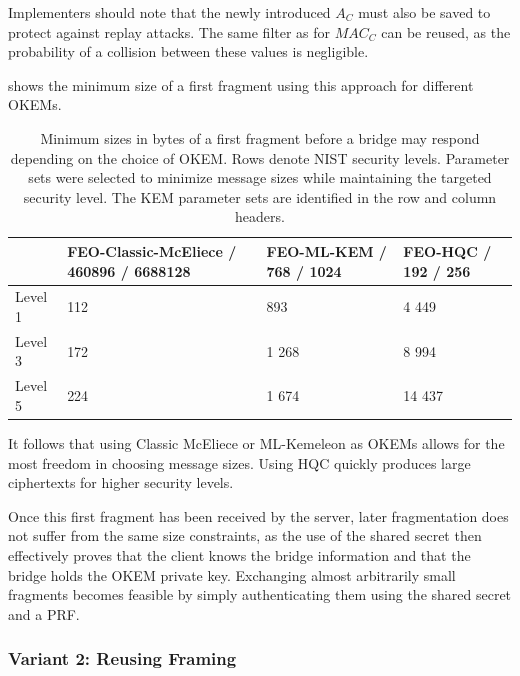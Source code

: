 Implementers should note that the newly introduced $A_C$ must also be saved to protect against replay attacks. The same filter as for $MAC_C$ can be reused, as the probability of a collision between these values is negligible.

 shows the minimum size of a first fragment using this approach for different OKEMs.

\begin{table}
    \centering
    \begin{tabular}{@{} L{0.1\textwidth-\tabcolsep} | R{0.35\tabcolsep} R{0.25\tabcolsep} R{0.2\textwidth-\tabcolsep} @{}}
        & FEO-Classic-McEliece / 460896 / 6688128
        & FEO-ML-KEM / 768 / 1024
        & FEO-HQC / 192 / 256
        \\ \hline
    Level 1 & 112 & 893 & 4 449 \\
    Level 3 & 172 & 1 268 & 8 994 \\
    Level 5 & 224 & 1 674 & 14 437
    \end{tabular}
    \caption[
        Minimum sizes in bytes of a first fragment before a bridge may respond depending on the choice of OKEM.
    ]{
        Minimum sizes in bytes of a first fragment before a bridge may respond depending on the choice of OKEM. Rows denote NIST security levels. Parameter sets were selected to minimize message sizes while maintaining the targeted security level. The KEM parameter sets are identified in the row and column headers.
    }
    \label{tab:frag-min-needed}
\end{table}

It follows that using Classic McEliece or ML-Kemeleon as OKEMs allows for the most freedom in choosing message sizes. Using HQC quickly produces large ciphertexts for higher security levels.

Once this first fragment has been received by the server, later fragmentation does not suffer from the same size constraints, as the use of the shared secret then effectively proves that the client knows the bridge information and that the bridge holds the OKEM private key. Exchanging almost arbitrarily small fragments becomes feasible by simply authenticating them using the shared secret and a PRF.

\subsubsection{Variant 2: Reusing \obfsfour{} Framing} \label{sssec:variant-framing}

